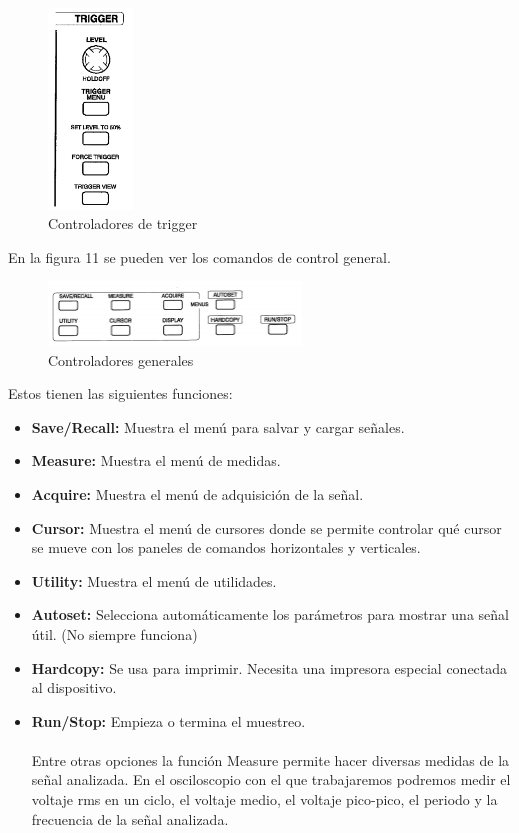 \documentclass[12pt]{article}
\begin{document}
\begin{figure}[h!]
	\centering
	\includegraphics[width=0.20\textwidth,height=0.35\textheight]{osc-trigger}
	\caption{Controladores de trigger}
\end{figure}

En la figura 11 se pueden ver los comandos de control general. \\

\begin{figure}[h!]
	\centering
	\includegraphics[width=0.60\textwidth,height=0.25\textheight]{osc-control}
	\caption{Controladores generales}
\end{figure}


Estos tienen las siguientes funciones:

\begin{itemize}
	\item \textbf{Save/Recall:} Muestra el menú para salvar y cargar señales.
	\item \textbf{Measure:} Muestra el menú de medidas.
	\item \textbf{Acquire:} Muestra el menú de adquisición de la señal.
	\item \textbf{Cursor:} Muestra el menú de cursores donde se permite controlar qué cursor se mueve con los paneles de comandos horizontales y verticales.
	\item \textbf{Utility:} Muestra el menú de utilidades.
	\item \textbf{Autoset:} Selecciona automáticamente los parámetros para mostrar una señal útil. (No siempre funciona)
	\item \textbf{Hardcopy:} Se usa para imprimir. Necesita una impresora especial conectada al dispositivo.
	\item \textbf{Run/Stop:} Empieza o termina el muestreo.\\
\\
Entre otras opciones la función Measure permite hacer diversas medidas de la señal analizada. En el osciloscopio con el que trabajaremos podremos medir el voltaje rms en un ciclo, el voltaje medio, el voltaje pico-pico, el periodo y la frecuencia de la señal analizada.

\end{itemize}
\end{document}
